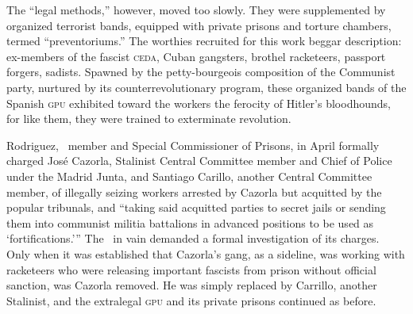 The ``legal methods,'' however, moved too slowly. They were supplemented by organized terrorist bands, equipped with private prisons and torture chambers, termed ``preventoriums.'' The worthies recruited for this work beggar description: ex-members of the fascist \textsc{ceda}, Cuban gangsters, brothel racketeers, passport forgers, sadists. Spawned by the petty-bourgeois composition of the Communist party, nurtured by its counterrevolutionary program, these organized bands of the Spanish \textsc{gpu} exhibited toward the workers the ferocity of Hitler’s bloodhounds, for like them, they were trained to exterminate revolution.

Rodriguez, \CNT\ member and Special Commissioner of Prisons, in April formally charged José Cazorla, Stalinist Central Committee member and Chief of Police under the Madrid Junta, and Santiago Carillo, another Central Committee member, of illegally seizing workers arrested by Cazorla but acquitted by the popular tribunals, and ``taking said acquitted parties to secret jails or sending them into communist militia battalions in advanced positions to be used as `fortifications.'\kp\kp'' The \CNT\ in vain demanded a formal investigation of its charges. Only when it was established that Cazorla’s gang, as a sideline, was working with racketeers who were releasing important fascists from prison without official sanction, was Cazorla removed. He was simply replaced by Carrillo, another Stalinist, and the extralegal \textsc{gpu} and its private prisons continued as before.

